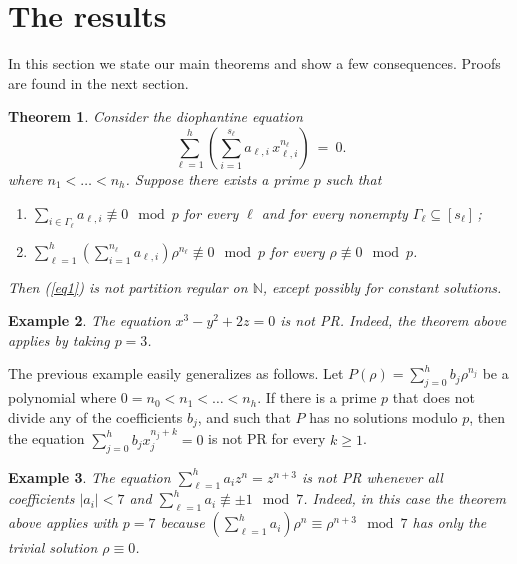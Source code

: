 \documentclass[11pt]{amsart}
\newtheorem{theorem}{Theorem}[section]
\theoremstyle{definition}
\newtheorem{example}[theorem]{Example}
\theoremstyle{remark}
\numberwithin{equation}{section}
\begin{document}
\section{The results}

In this section we state our main theorems and 
show a few consequences.  
Proofs are found in the next section.

\begin{theorem}\label{main1}
Consider the diophantine equation
\begin{equation}\label{eq1}
\sum_{\ell=1}^h 
\left(\sum_{i=1}^{s_\ell}a_{\ell,i}\,x_{\ell,i}^{n_\ell}\right)\ =\ 0.
\end{equation}
where $n_1<\ldots<n_h$. Suppose there exists
a prime $p$ such that

\smallskip
\begin{enumerate}
\item
$\sum_{i\in\Gamma_\ell}a_{\ell,i}\not\equiv 0\mod p$ 
for every $\ell$ and for every nonempty 
$\Gamma_\ell\subseteq[s_\ell]$\,;

\smallskip
\item
$\sum_{\ell=1}^h 
\left(\sum_{i=1}^{n_\ell}a_{\ell,i}\right)\rho^{n_\ell}\not\equiv 0\mod p$
for every $\rho\not\equiv 0\mod p$.
\end{enumerate}

\smallskip
Then (\ref{eq1}) is not partition regular on ${\mathbb{N}}$,
except possibly for constant solutions.
\end{theorem}

\begin{example}
\emph{The equation $x^3-y^2+2z=0$ is not PR.
Indeed, the theorem above applies by taking $p=3$.}
\end{example}

\smallskip
The previous example easily generalizes as follows.
Let $P(\rho)=\sum_{j=0}^h b_j\rho^{n_j}$ be a polynomial
where $0=n_0<n_1<\ldots<n_h$. If there is a prime
$p$ that does not divide any of the coefficients $b_j$,
and such that $P$ has no solutions modulo $p$,
then the equation $\sum_{j=0}^h b_j x_j^{n_j+k}=0$
is not PR for every $k\ge 1$.
 
\smallskip
\begin{example}
\emph{The equation $\sum_{\ell=1}^h a_iz^n=z^{n+3}$
is not PR whenever all coefficients $|a_i|<7$ and
$\sum_{\ell=1}^h a_i\not\equiv \pm 1\mod 7$.
Indeed, in this case
the theorem above applies with $p=7$
because $(\sum_{\ell=1}^h a_i)\rho^n\equiv\rho^{n+3}\mod 7$
has only the trivial solution $\rho\equiv0$.}
\end{example}
\end{document}
